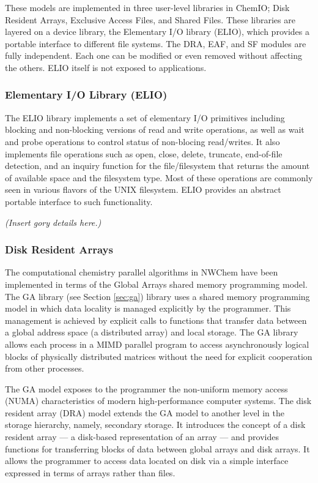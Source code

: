 These models are implemented in three user-level libraries in ChemIO; Disk Resident
Arrays, Exclusive Access Files, and Shared Files.  These libraries are layered on
a device library, the Elementary I/O library (ELIO), which provides a portable
interface to different file systems.  The DRA, EAF, and SF modules are fully
independent.  Each one can be modified or even removed without affecting the others.
ELIO itself is not exposed to applications.

\subsubsection{Elementary I/O Library (ELIO)}

The ELIO library implements a set of elementary I/O primitives including blocking and
non-blocking versions of read and write operations, as well as wait and probe operations to
control status of non-blocing read/writes.  It also implements file operations such
as open, close, delete, truncate, end-of-file detection, and an inquiry function
for the file/filesystem that returns the amount of available space and the filesystem
type.  Most of these operations are commonly seen in various flavors of the UNIX
filesystem.  ELIO provides an abstract portable interface to such functionality.

{\em (Insert gory details here.)}

\subsubsection{Disk Resident Arrays}

The computational chemistry parallel algorithms in NWChem have been implemented in terms
of the Global Arrays shared memory programming model.  The GA library (see Section 
\ref{sec:ga}) library uses a shared memory programming model in which data locality
is managed explicitly by the programmer.  This management is achieved by explicit
calls to functions that transfer data between a global address space (a distributed
array) and local storage.  The GA library allows each process in a MIMD parallel
program to access asynchronously logical blocks of physically distributed matrices
without the need for explicit cooperation from other processes.

The GA model exposes to the programmer the non-uniform memory access (NUMA) characteristics
of modern high-performance computer systems.  The disk resident array (DRA) model extends
the GA model to another level in the storage hierarchy, namely, secondary storage.  It 
introduces the concept of a disk resident array --- a disk-based representation of an
array --- and provides functions for transferring blocks of data between global arrays
and disk arrays.  It allows the programmer to access data located on disk via a
simple interface expressed in terms of arrays rather than files.

